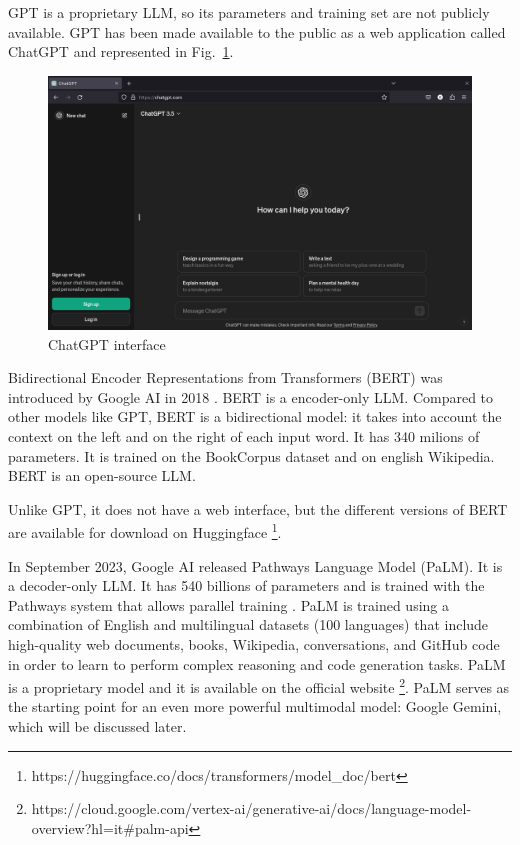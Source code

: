 GPT is a proprietary LLM, so its parameters and training set are not publicly available.
GPT has been made available to the public as a web application called ChatGPT and represented in Fig.~\ref{fig:18}.

\begin{figure}[H]
    \centering
    \includegraphics[width=0.9\linewidth]{Figures/fig_18.png}
    \caption{ChatGPT interface}
    \label{fig:18}
\end{figure}

Bidirectional Encoder Representations from Transformers (BERT) was introduced by Google AI in 2018 \cite{kenton2019bert}.
BERT is a encoder-only LLM.
Compared to other models like GPT, BERT is a bidirectional model: it takes into account the context on the left and on the right of each input word.
It has 340 milions of parameters.
It is trained on the BookCorpus dataset \cite{bandy2021addressing} and on english Wikipedia. BERT is an open-source LLM.

Unlike GPT, it does not have a web interface, but the different versions of BERT are available for download on Huggingface \footnote{https://huggingface.co/docs/transformers/model\_doc/bert}.

In September 2023, Google AI released Pathways Language Model (PaLM).
It is a decoder-only LLM.
It has 540 billions of parameters and is trained with the Pathways system that allows parallel training \cite{anil2023palm,barham2022pathways}.
PaLM is trained using a combination of English and multilingual datasets (100 languages) that include high-quality web documents, books, Wikipedia, conversations, and GitHub code in order to learn to perform complex reasoning and code generation tasks\cite{palm2_intro}.
PaLM is a proprietary model and it is available on the official website \footnote{https://cloud.google.com/vertex-ai/generative-ai/docs/language-model-overview?hl=it\#palm-api}.
PaLM serves as the starting point for an even more powerful multimodal model: Google Gemini, which will be discussed later.

